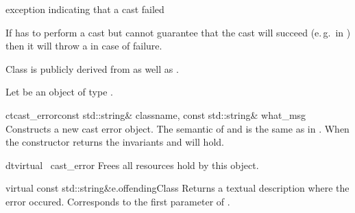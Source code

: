 


\NAME

 \dotfill exception indicating that a cast failed



\ABSTRACT

If \LiDIA has to perform a cast but cannot  guarantee that the cast will
succeed (e.\,g.\ in ) then it will
throw a  in case of failure.


\DESCRIPTION

Class  is publicly derived from  as well as
. 

Let  be an object of type . 

\CONS

\begin{fcode}{ct}{cast_error}{const std::string& classname, 
                                 const std::string& what_msg}
  Constructs a new cast error object. The semantic of  and
   is the same as in . When the
  constructor returns the invariants  and  will hold.
\end{fcode}

\begin{fcode}{dt}{virtual ~cast_error}{}
  Frees all resources hold by this object.
\end{fcode}


\ACCS

\begin{cfcode}{virtual const std::string&}{e.offendingClass}{}
  Returns a textual description where the error occured. Corresponds to the
  first parameter of .
\end{cfcode}

